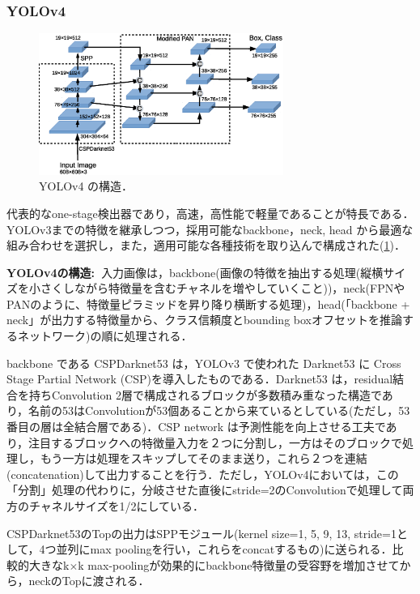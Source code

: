\documentclass[originalpaper,fleqn]{jsaiart}     %
\begin{document}
\subsubsection{YOLOv4}
\begin{figure}[tb]
    \begin{center}
        \includegraphics[width=8cm,clip]{fig/archi_YOLOv4.eps}
    \end{center}
    \caption{ YOLOv4 の構造．}
    \label{fig:archi_YOLOv4}
\end{figure}
代表的なone-stage検出器であり，高速，高性能で軽量であることが特長である\cite{BWL20}．YOLOv3までの特徴を継承しつつ，採用可能なbackbone，neck, head から最適な組み合わせを選択し，また，適用可能な各種技術を取り込んで構成された(\ref{fig:archi_YOLOv4})．

{\bf YOLOv4の構造:\ }入力画像は，backbone(画像の特徴を抽出する処理(縦横サイズを小さくしながら特徴量を含むチャネルを増やしていくこと))，neck(FPNやPANのように、特徴量ピラミッドを昇り降り横断する処理)，head(「backbone + neck」が出力する特徴量から、クラス信頼度とbounding boxオフセットを推論するネットワーク)の順に処理される．

backbone である CSPDarknet53 は，YOLOv3 で使われた Darknet53 に Cross Stage Partial Network (CSP)を導入したものである．Darknet53 は，residual結合を持ちConvolution 2層で構成されるブロックが多数積み重なった構造であり，名前の53はConvolutionが53個あることから来ているとしている(ただし，53番目の層は全結合層である)．CSP network は予測性能を向上させる工夫であり，注目するブロックへの特徴量入力を２つに分割し，一方はそのブロックで処理し，もう一方は処理をスキップしてそのまま送り，これら２つを連結(concatenation)して出力することを行う．ただし，YOLOv4においては，この「分割」処理の代わりに，分岐させた直後にstride=2のConvolutionで処理して両方のチャネルサイズを1/2にしている．

CSPDarknet53のTopの出力はSPPモジュール(kernel size={1, 5, 9, 13}, stride=1として，4つ並列にmax poolingを行い，これらをconcatするもの)に送られる．比較的大きなk$\times$k max-poolingが効果的にbackbone特徴量の受容野を増加させてから，neckのTopに渡される．
\end{document}
